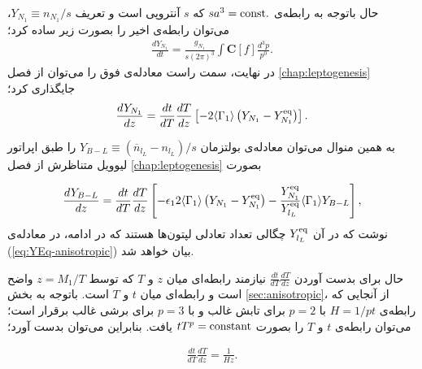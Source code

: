 \documentclass[a4paper]{book}
\begin{document}
حال باتوجه به رابطه‌ی {\footnotesize$sa^3=\rm const.$} که {\footnotesize$s$} آنتروپی است و تعریف {\footnotesize$Y_{N_1} \equiv n_{N_1}/s$}، می‌توان رابطه‌ی اخیر را بصورت زیر ساده کرد؛
{\footnotesize\begin{align}
	\frac{dY_{N_1}}{dt} = \frac{g_{N_1}}{s (2\pi)^3} \int \boldsymbol{C}[f] \frac{d^3p}{p^0}.
\end{align}}
در نهایت، سمت راست معادله‌ی فوق را می‌توان از فصل \ref{chap:leptogenesis} جایگذاری کرد؛
{\footnotesize\begin{align}
	\frac{dY_{N_1}}{dz} = \frac{dt}{dT} \frac{dT}{dz} \left[- 2 \langle \Gamma_1 \rangle \left( Y_{N_1} - Y_{N_1}^{{\rm eq}} \right)\right].
	\label{eq:anisotropic-Boltzmann-l}
\end{align}}
									
به همین منوال می‌توان معادله‌ی بولتزمان {\footnotesize$Y_{B-L}\equiv (\overline{n}_{l_L} - n_{l_L})/s$} را طبق اپراتور لیوویل متناظرش از فصل \ref{chap:leptogenesis} بصورت
\par
\vspace{-0.5cm}
{\footnotesize\begin{align}
	\frac{dY_{B-L}}{dz} = \frac{dt}{dT} \frac{dT}{dz} \left[- \epsilon_1 2 \langle \Gamma_1 \rangle \left( Y_{N_1} - Y_{N_1}^{{\rm eq}} \right) - \frac{Y_{N_1}^{{\rm eq}}}{Y_{{l_L}}^{{\rm eq}}} \langle \Gamma_{1} \rangle Y_{B-L}\right],
	\label{eq:anisotropic-Boltzmann-r}
\end{align}}
نوشت که در آن {\footnotesize$Y_{{l_L}}^{{\rm eq}}$} چگالی تعداد تعادلی لپتون‌ها هستند که در ادامه، در معادله‌ی (\ref{eq:YEq-anisotropic}) بیان خواهد شد.
									
حال برای بدست آوردن {\footnotesize$\frac{dt}{dT} \frac{dT}{dz}$} نیازمند رابطه‌ای میان {\footnotesize$z$} و {\footnotesize$T$} که توسط {\footnotesize$z=M_1/T$} واضح است و رابطه‌ای میان {\footnotesize$t$} و {\footnotesize$T$} است.
باتوجه به بخش \ref{sec:anisotropic}، از آنجایی که رابطه‌ی {\footnotesize$H = 1/pt$} با {\footnotesize$p=2$} برای تابش غالب و با {\footnotesize$p=3$} برای برشی غالب برقرار است؛ می‌توان رابطه‌ی {\footnotesize$t$} و {\footnotesize$T$}  را بصورت {\footnotesize$tT^p=\rm constant$} یافت. بنابراین می‌توان بدست آورد؛
\par
\vspace{-0.5cm}
{\footnotesize\begin{align}
	\frac{dt}{dT} \frac{dT}{dz} = \frac{1}{Hz}.
\end{align}}
\end{document}
